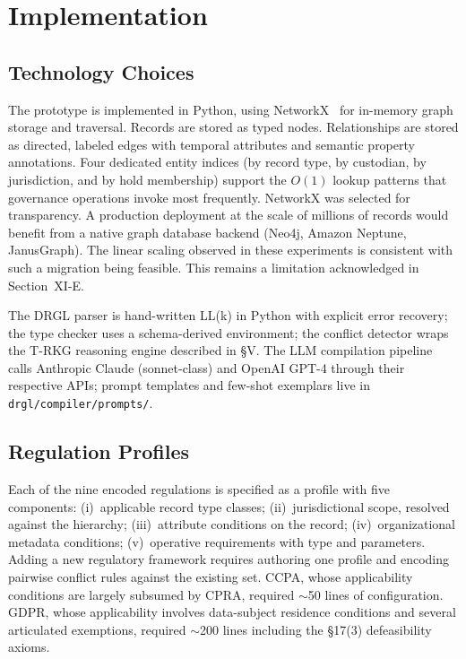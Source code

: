 \documentclass{ieeeaccess}
\begin{document}
\section{Implementation}

\subsection{Technology Choices}

The prototype is implemented in Python, using NetworkX~\cite{networkx} for in-memory graph storage and traversal. Records are stored as typed nodes. Relationships are stored as directed, labeled edges with temporal attributes and semantic property annotations. Four dedicated entity indices (by record type, by custodian, by jurisdiction, and by hold membership) support the $O(1)$ lookup patterns that governance operations invoke most frequently. NetworkX was selected for transparency. A production deployment at the scale of millions of records would benefit from a native graph database backend (Neo4j, Amazon Neptune, JanusGraph). The linear scaling observed in these experiments is consistent with such a migration being feasible. This remains a limitation acknowledged in Section~XI-E.

The DRGL parser is hand-written LL(k) in Python with explicit error recovery; the type checker uses a schema-derived environment; the conflict detector wraps the T-RKG reasoning engine described in §V. The LLM compilation pipeline calls Anthropic Claude (sonnet-class) and OpenAI GPT-4 through their respective APIs; prompt templates and few-shot exemplars live in \texttt{drgl/compiler/prompts/}.

\subsection{Regulation Profiles}

Each of the nine encoded regulations is specified as a profile with five components: (i)~applicable record type classes; (ii)~jurisdictional scope, resolved against the hierarchy; (iii)~attribute conditions on the record; (iv)~organizational metadata conditions; (v)~operative requirements with type and parameters. Adding a new regulatory framework requires authoring one profile and encoding pairwise conflict rules against the existing set. CCPA, whose applicability conditions are largely subsumed by CPRA, required $\sim$50 lines of configuration. GDPR, whose applicability involves data-subject residence conditions and several articulated exemptions, required $\sim$200 lines including the §17(3) defeasibility axioms.
\end{document}
